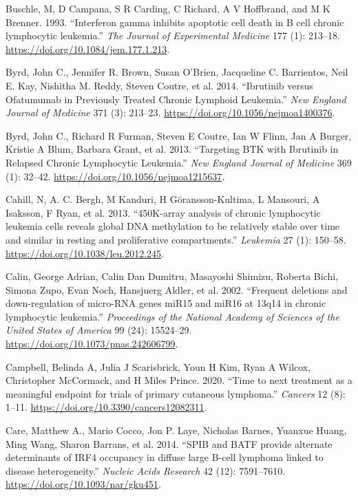 \documentclass[11pt, a4paper, twosided]{book}
\newenvironment{CSLReferences}%
  {}%
  {\par}
\begin{document}
\begin{CSLReferences}{1}{0}
\leavevmode{}%
Buschle, M, D Campana, S R Carding, C Richard, A V Hoffbrand, and M K Brenner. 1993. {``{Interferon gamma inhibits apoptotic cell death in B cell chronic lymphocytic leukemia.}''} \emph{The Journal of Experimental Medicine} 177 (1): 213--18. \url{https://doi.org/10.1084/jem.177.1.213}.

\leavevmode{}%
Byrd, John C., Jennifer R. Brown, Susan O'Brien, Jacqueline C. Barrientos, Neil E. Kay, Nishitha M. Reddy, Steven Coutre, et al. 2014. {``{Ibrutinib versus Ofatumumab in Previously Treated Chronic Lymphoid Leukemia}.''} \emph{New England Journal of Medicine} 371 (3): 213--23. \url{https://doi.org/10.1056/nejmoa1400376}.

\leavevmode{}%
Byrd, John C., Richard R Furman, Steven E Coutre, Ian W Flinn, Jan A Burger, Kristie A Blum, Barbara Grant, et al. 2013. {``{Targeting BTK with Ibrutinib in Relapsed Chronic Lymphocytic Leukemia}.''} \emph{New England Journal of Medicine} 369 (1): 32--42. \url{https://doi.org/10.1056/nejmoa1215637}.

\leavevmode{}%
Cahill, N, A. C. Bergh, M Kanduri, H Göransson-Kultima, L Mansouri, A Isaksson, F Ryan, et al. 2013. {``{450K-array analysis of chronic lymphocytic leukemia cells reveals global DNA methylation to be relatively stable over time and similar in resting and proliferative compartments}.''} \emph{Leukemia} 27 (1): 150--58. \url{https://doi.org/10.1038/leu.2012.245}.

\leavevmode{}%
Calin, George Adrian, Calin Dan Dumitru, Masayoshi Shimizu, Roberta Bichi, Simona Zupo, Evan Noch, Hansjuerg Aldler, et al. 2002. {``{Frequent deletions and down-regulation of micro-RNA genes miR15 and miR16 at 13q14 in chronic lymphocytic leukemia}.''} \emph{Proceedings of the National Academy of Sciences of the United States of America} 99 (24): 15524--29. \url{https://doi.org/10.1073/pnas.242606799}.

\leavevmode{}%
Campbell, Belinda A, Julia J Scarisbrick, Youn H Kim, Ryan A Wilcox, Christopher McCormack, and H Miles Prince. 2020. {``{Time to next treatment as a meaningful endpoint for trials of primary cutaneous lymphoma}.''} \emph{Cancers} 12 (8): 1--11. \url{https://doi.org/10.3390/cancers12082311}.

\leavevmode{}%
Care, Matthew A., Mario Cocco, Jon P. Laye, Nicholas Barnes, Yuanxue Huang, Ming Wang, Sharon Barrans, et al. 2014. {``{SPIB and BATF provide alternate determinants of IRF4 occupancy in diffuse large B-cell lymphoma linked to disease heterogeneity}.''} \emph{Nucleic Acids Research} 42 (12): 7591--7610. \url{https://doi.org/10.1093/nar/gku451}.


\end{CSLReferences}
\end{document}
